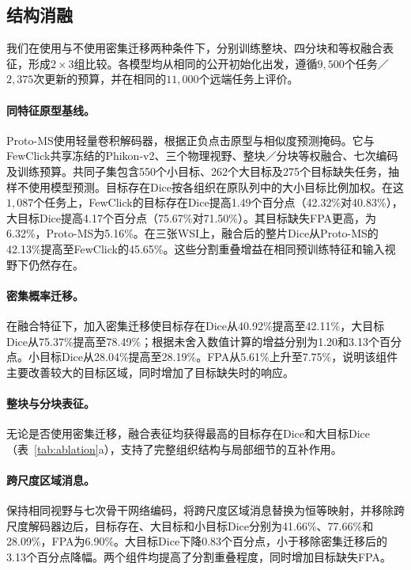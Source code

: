 \subsection{结构消融}

我们在使用与不使用密集迁移两种条件下，分别训练整块、四分块和等权融合表征，形成$2\times3$组比较。各模型均从相同的公开初始化出发，遵循$9{,}500$个任务／$2{,}375$次更新的预算，并在相同的$11{,}000$个远端任务上评价。

\paragraph{同特征原型基线。}
Proto-MS使用轻量卷积解码器，根据正负点击原型与相似度预测掩码。它与FewClick共享冻结的Phikon-v2、三个物理视野、整块／分块等权融合、七次编码及训练预算。共同子集包含550个小目标、262个大目标及275个目标缺失任务，抽样不使用模型预测。目标存在Dice按各组织在原队列中的大小目标比例加权。在这$1{,}087$个任务上，FewClick的目标存在Dice提高1.49个百分点（42.32\%对40.83\%），大目标Dice提高4.17个百分点（75.67\%对71.50\%）。其目标缺失FPA更高，为6.32\%，Proto-MS为5.16\%。在三张WSI上，融合后的整片Dice从Proto-MS的42.13\%提高至FewClick的45.65\%。这些分割重叠增益在相同预训练特征和输入视野下仍然存在。

\paragraph{密集概率迁移。}
在融合特征下，加入密集迁移使目标存在Dice从40.92\%提高至42.11\%，大目标Dice从75.37\%提高至78.49\%；根据未舍入数值计算的增益分别为1.20和3.13个百分点。小目标Dice从28.04\%提高至28.19\%。FPA从5.61\%上升至7.75\%，说明该组件主要改善较大的目标区域，同时增加了目标缺失时的响应。

\paragraph{整块与分块表征。}
无论是否使用密集迁移，融合表征均获得最高的目标存在Dice和大目标Dice（表~\ref{tab:ablation}a），支持了完整组织结构与局部细节的互补作用。

\paragraph{跨尺度区域消息。}
保持相同视野与七次骨干网络编码，将跨尺度区域消息替换为恒等映射，并移除跨尺度解码器边后，目标存在、大目标和小目标Dice分别为41.66\%、77.66\%和28.09\%，FPA为6.90\%。大目标Dice下降0.83个百分点，小于移除密集迁移后的3.13个百分点降幅。两个组件均提高了分割重叠程度，同时增加目标缺失FPA。

